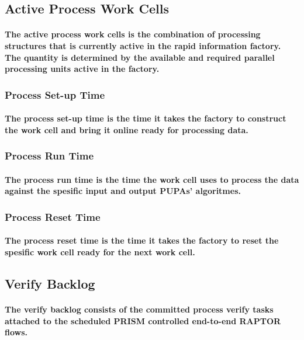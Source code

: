 \documentclass{acm_proc_article-sp}
\begin{document}
\subsection{\textbf{Active Process Work Cells}}
\paragraph{The active process work cells is the combination of processing structures that is currently active in the rapid information factory. The quantity is determined by the available and required parallel processing units active in the factory.}
\subsubsection{\textbf{Process Set-up Time}}
\paragraph{The process set-up time is the time it takes the factory to construct the work cell and bring it online ready for processing data.}
\subsubsection{\textbf{Process Run Time}}
\paragraph{The process run time is the time the work cell uses to process the data against the spesific input and output PUPAs' algoritmes.}
\subsubsection{\textbf{Process Reset Time}}
\paragraph{The process reset time is the time it takes the factory to reset the spesific work cell ready for the next work cell.}
\subsection{Verify Backlog}
\paragraph{The verify backlog consists of the committed process verify tasks attached to the scheduled PRISM controlled end-to-end RAPTOR flows.}
\end{document}

